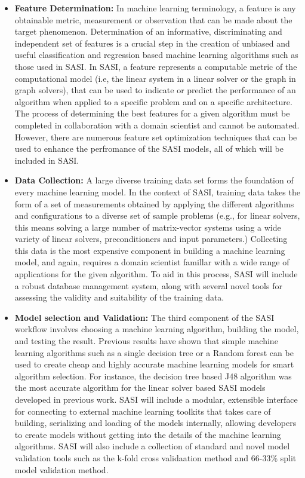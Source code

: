 \begin{itemize}
 \item {\bf Feature Determination:} In machine learning terminology, a feature is any obtainable metric, measurement or observation that can be made about the target phenomenon. Determination of an informative, discriminating and independent set of features is a crucial step in the creation of unbiased and useful classification and regression based machine learning algorithms such as those used in SASI.  In SASI, a feature represents a computable metric of the computational model (i.e, the linear system in a linear solver or the graph in graph solvers), that can be used to indicate or predict the performance of an algorithm when applied to a specific problem and on a specific architecture. The process of determining the best features for a given algorithm must be completed in collaboration with a domain scientist and cannot be automated. However, there are numerous feature set optimization techniques that can be used to enhance the perfromance of the SASI models, all of which will be included in SASI.  
 
 \item {\bf Data Collection:} A large diverse training data set forms the foundation of every machine learning model. In the context of SASI, training data takes the form of a set of measurements obtained by applying the different algorithms and configurations to a diverse set of sample problems (e.g., for linear solvers, this means solving a large number of matrix-vector systems using a wide variety of linear solvers, preconditioners and input parameters.) Collecting this data is the most expensive component in building a machine learning model, and again, requires a domain scientist famillar with a wide range of applications for the given algorithm. To aid in this process, SASI will include a robust database management system, along with several novel tools for assessing the validity and suitability of the training data.  
 
 \item {\bf Model selection and Validation:} The third component of the SASI workflow involves choosing a machine learning algorithm, building the model, and testing the result. Previous results have shown that simple machine learning algorithms such as a single decision tree or a Random forest can be used to create cheap and highly accurate machine learning models for smart algorithm selection. For instance, the decision tree based J48 algorithm was the most accurate algorithm for the linear solver based SASI models developed in previous work. SASI will include a modular, extensible interface for connecting to external machine learning toolkits that takes care of building, serializing and loading of the models internally, allowing developers to create models without getting into the details of the machine learning algorithms. SASI will also include a collection of standard and novel model validation tools such as the k-fold cross validaation method and 66-33\% split model validation method.    
 

\end{itemize}
